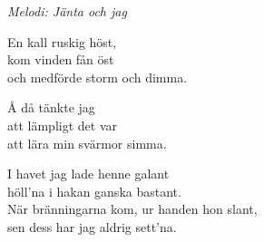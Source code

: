 {\footnotesize\textit{Melodi: Jänta och jag}}\par
\vspace{10pt}
En kall ruskig höst,\\
kom vinden fån öst\\
och medförde storm och dimma.\par
\vspace{10pt}
Å då tänkte jag\\
att lämpligt det var\\
att lära min svärmor simma.\par
\vspace{10pt}
I havet jag lade henne galant\\
höll'na i hakan ganska bastant.\\
När bränningarna kom, ur handen hon slant,\\
sen dess har jag aldrig sett'na.
